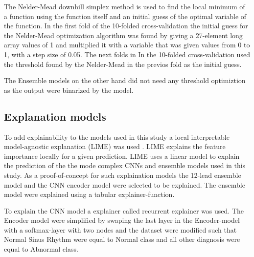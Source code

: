 The Nelder-Mead downhill simplex method is used to find the local minimum of a function using the function itself and an initial guess of the optimal variable of the function. In the first fold of the 10-folded cross-validation the initial guess for the Nelder-Mead optimization algorithm was found by giving a 27-element long array values of 1 and multiplied it with a variable that was given values from 0 to 1, with a step size of 0.05. The next folds in In the 10-folded cross-validation used the threshold found by the Nelder-Mead in the previos fold as the initial guess. 

The Ensemble models on the other hand did not need any threshold optimiztion as the output were binarized by the model.





\subsection{Explanation models}
To add explainability to the models used in this study a local interpretable model-agnostic explanation (LIME) was used \cite{lime}. LIME explains the feature importance locally for a given prediction. LIME uses a linear model to explain the prediction of the the mode complex CNNs and ensemble models used in this study. As a proof-of-concept for such explaination models the 12-lead ensemble model and the CNN encoder model were selected to be explained. The ensemble model were explained using a tabular explainer-function.

To explain the CNN model a explainer called recurrent explainer was used. The Encoder model were simplified by swaping the last layer in the Encoder-model with a softmax-layer with two nodes and the dataset were modified such that Normal Sinus Rhythm were equal to Normal class and all other diagnosis were equal to Abnormal class.

\newpage
